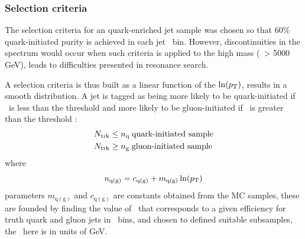 %
%
%

\subsubsection{Selection criteria}

The selection criteria for an quark-enriched jet sample was chosen so that 60\% quark-initiated purity is achieved in each jet \pt~bin. However, discontinuities in the \mjj spectrum would occur when such criteria is applied to the high mass (\pt~> 5000 GeV), leads to difficulties presented in resonance search. 


A selection criteria is thus built as a linear function of the $\ln(p_{\mathrm{T}}) $, results in a smooth \mjj distribution. \textsf{A jet is tagged as being more likely to be quark-initiated if \ntrk~is less than
the threshold \nq and more likely to be gluon-initiated if \ntrk~is 
greater than the threshold \ngluon: }
\begin{align}
\ntrk & \le \nq \; \mbox{quark-initiated sample} %
\\
\ntrk	  & \ge \ngluon \; \mbox{gluon-initiated sample} \nonumber
\end{align}
where   
\begin{equation}
n_{\mathrm{q(g)}} = {c_{\mathrm{q(g)}} + m_{\mathrm{q(g)}} \ln(p_{\mathrm{T}})}  \label{eq:nqg2}
\end{equation}
parameters $m_{\mathrm{q(g)}}$ and $c_{\mathrm{q(g)}}$ are constants obtained from the MC samples, these are founded by  finding the value of \ntrk\ 
that corresponds to a given efficiency for truth quark and gluon jets in 
\pt~bins, and chosen to defined suitable subsamples, the \pt~here is in units of GeV.


